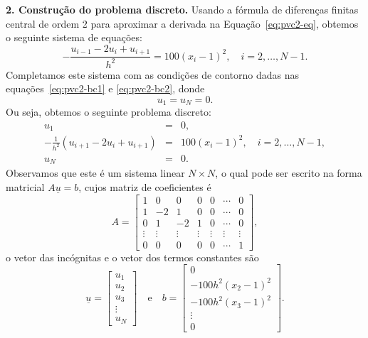 \begin{sol}
{\bf 2. Construção do problema discreto.} Usando a fórmula de diferenças finitas central de ordem 2 para aproximar a derivada na Equação~\eqref{eq:pvc2-eq}, obtemos o seguinte sistema de equações:
\begin{equation}
  - \frac{u_{i-1} - 2u_i + u_{i+1}}{h^2} = 100(x_i - 1)^2,\quad i = 2, \dotsc, N-1.
\end{equation}
Completamos este sistema com as condições de contorno dadas nas equações~\eqref{eq:pvc2-bc1} e \eqref{eq:pvc2-bc2}, donde
\begin{equation}
  u_1 = u_N = 0.
\end{equation}
Ou seja, obtemos o seguinte problema discreto:
\begin{eqnarray}
  u_1 &=& 0,\label{eq:pvc2_disc_bc1}\\
  -\frac{1}{h^2}\left(u_{i+1} - 2u_i + u_{i+1}\right) &=& 100(x_i-1)^2,\quad i=2, \dotsc, N-1,\\
  u_N &=& 0.\label{eq:pvc2_disc_bc2}
\end{eqnarray}
Observamos que este é um sistema linear $N\times N$, o qual pode ser escrito na forma matricial $A\underline{u} = b$, cujos matriz de coeficientes é
\begin{equation}
  A = 
  \begin{bmatrix}
    1 & 0 & 0 & 0 & 0 & \cdots & 0\\
    1 & -2 & 1 & 0 & 0 & \cdots & 0\\
    0 & 1 & -2 & 1 & 0 & \cdots & 0\\
    \vdots & \vdots & \vdots & \vdots & \vdots & \vdots & \vdots\\
    0 & 0 & 0 & 0 & 0 & \cdots & 1
  \end{bmatrix},
\end{equation}
o vetor das incógnitas e o vetor dos termos constantes são
\begin{equation}
  \underline{u} =
  \begin{bmatrix}
    u_1\\
    u_2\\
    u_3\\
    \vdots\\
    u_N
  \end{bmatrix}\quad\text{e}\quad
  b =
  \begin{bmatrix}
    0\\
    -100h^{2}(x_2-1)^2\\
    -100h^{2}(x_3-1)^2\\
    \vdots\\
    0
  \end{bmatrix}.
\end{equation}


\end{sol}

